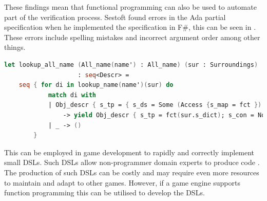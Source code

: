 These findings mean that functional programming can also be used to automate part of the verification process. Sestoft found errors in the Ada partial specification when he implemented the specification in F\#, this can be seen in . These errors include spelling mistakes and incorrect argument order among other things.

\begin{lstlisting}[language=fsharp, caption={Sestoft's F\# Implementation of Ada \cite{sestoft:isola}},label={lst:ada-fsh-impl}]
let lookup_all_name (All_name(name') : All_name) (sur : Surroundings)
                    : seq<Descr> =
    seq { for di in lookup_name(name')(sur) do
            match di with
            | Obj_descr { s_tp = { s_ds = Some (Access {s_map = fct }) } }
                -> yield Obj_descr { s_tp = fct(sur.s_dict); s_con = None }
            | _ -> ()
        }
\end{lstlisting}

This can be employed in game development to rapidly and correctly implement small \acp{DSL}. Such \acp{DSL} allow non-programmer domain experts to produce code \cite{beyak2011saga}. The production of such \acp{DSL} can be costly and may require even more resources to maintain and adapt to other games. However, if a game engine supports function programming this can be utilised to develop the \acp{DSL}.
